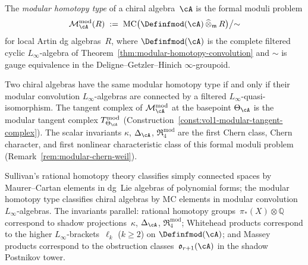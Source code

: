 \begin{definition}
\label{def:modular-homotopy-type}
The \emph{modular homotopy type} of a chiral algebra~$\cA$ is
the formal moduli problem
\begin{equation}\label{eq:modular-homotopy-type}
\mathcal{M}^{\mathrm{mod}}_\cA(R)
\;:=\;
\mathrm{MC}\bigl(
\Definfmod(\cA)
\,\widehat\otimes_{\mathfrak{m}}\,R
\bigr)\big/{\sim}
\end{equation}
for local Artin dg algebras~$R$, where $\Definfmod(\cA)$ is the
complete filtered cyclic $L_\infty$-algebra of
Theorem~\ref{thm:modular-homotopy-convolution} and $\sim$ is
gauge equivalence in the Deligne--Getzler--Hinich
$\infty$-groupoid.

Two chiral algebras have the same modular homotopy type if and
only if their modular convolution $L_\infty$-algebras are
connected by a filtered $L_\infty$-quasi-isomorphism.  The tangent
complex of $\mathcal{M}^{\mathrm{mod}}_\cA$ at the basepoint
$\Theta_\cA$ is the modular tangent complex
$T^{\mathrm{mod}}_{\Theta_\cA}$
(Construction~\ref{const:vol1-modular-tangent-complex}).
The scalar invariants $\kappa$, $\Delta_\cA$,
$\mathfrak{R}^{\mathrm{mod}}_4$ are the first Chern class,
Chern character, and first nonlinear characteristic class
of this formal moduli problem
(Remark~\ref{rem:modular-chern-weil}).
\end{definition}

\begin{remark}
\label{rem:sullivan-parallel}
Sullivan's rational homotopy theory classifies simply connected
spaces by Maurer--Cartan elements in dg~Lie algebras of polynomial
forms; the modular homotopy type classifies chiral algebras by
MC elements in modular convolution $L_\infty$-algebras.  The
invariants parallel: rational homotopy groups~$\pi_*(X)\otimes\mathbb{Q}$
correspond to shadow projections~$\kappa$, $\Delta_\cA$,
$\mathfrak{R}^{\mathrm{mod}}_4$; Whitehead products correspond to
the higher $L_\infty$-brackets~$\ell_k$ ($k\geq 2$) on
$\Definfmod(\cA)$; and Massey products correspond to the
obstruction classes~$\mathfrak{o}_{r+1}(\cA)$ in the shadow
Postnikov tower.
\end{remark}

